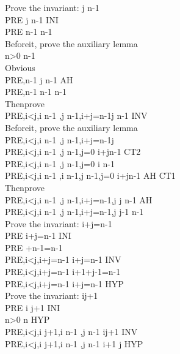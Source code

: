\documentclass[11pt,a4paper,fleqn]{article}
\begin{document}
\noindent
Prove \; the \; invariant:  j  \upto n-1\\
PRE \vdash [j:=n-1]j  \upto n-1 \;INI \\
PRE \vdash n-1  \upto n-1 \\
Before\;it, \; prove \; the \; auxiliary \; lemma \; \\
n>0 \vdash n-1  \\
Obvious \\
PRE,n-1  \vdash [j:=n-1]j  \upto n-1 \;AH \\
PRE,n-1  \vdash n-1  \upto n-1 \\
Then\;prove \\
PRE,i<j,i  \upto n-1 ,j  \upto n-1,i+j=n-1\vdash [j:=j-1]j \upto n-1 \;INV \\
Before\;it, \; prove \; the \; auxiliary \; lemma \; \\
PRE,i<j,i  \upto n-1 ,j  \upto n-1,i+j=n-1\vdash j \\
PRE,i<j,i  \upto n-1 ,j  \upto n-1,j=0 \vdash i+j\neq n-1\; CT2 \\
PRE,i<j,i  \upto n-1 ,j  \upto n-1,j=0 \vdash i  \upto n-1\\
PRE,i<j,i  \upto n-1 ,i  \upto n-1,j  \upto n-1,j=0 \vdash i+j\neq n-1\; AH \; CT1 \\
Then\;prove \\
PRE,i<j,i  \upto n-1 ,j  \upto n-1,i+j=n-1,j \vdash [j:=j-1]j \upto n-1 \;AH \\
PRE,i<j,i  \upto n-1 ,j  \upto n-1,i+j=n-1,j \vdash j-1  \upto n-1 \\


\noindent
Prove the invariant: i+j=n-1 \\
PRE \vdash [i:=0,j:=n-1]i+j=n-1 \;INI \\
PRE +n-1=n-1 \\
PRE,i<j,i+j=n-1 \vdash [i:=i+1,j:=j-1]i+j=n-1 \;INV \\
PRE,i<j,i+j=n-1 \vdash i+1+j-1=n-1 \\
PRE,i<j,i+j=n-1 \vdash i+j=n-1 \; HYP \\

\noindent
Prove the invariant: i\leq j+1 \\
PRE \vdash [i:=0,j:=n-1]i \leq j+1 \;INI \\
n>0  \leq n \;HYP \\
PRE,i<j,i \leq j+1,i  \upto n-1 ,j  \upto n-1 \vdash [i:=i+1,j:=j-1]i\leq j+1 \;INV \\
PRE,i<j,i \leq j+1,i  \upto n-1 ,j  \upto n-1 \vdash i+1 \leq j \;HYP\\
\end{document}
